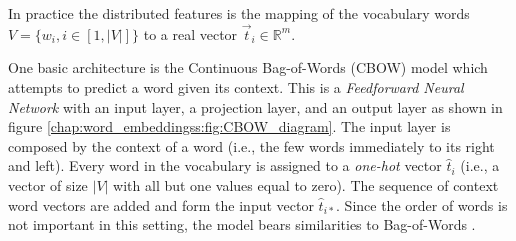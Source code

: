 In practice the distributed features is the mapping of the vocabulary words $V = \{w_{i}, i \in [1, |V|] \}$ to a real vector $\vec{t}_i \in \mathbb{R}^{m}$.



One basic architecture is the Continuous Bag-of-Words (CBOW) model which attempts to predict a word given its context. This is a \textit{Feedforward Neural Network} with an input layer, a projection layer, and an output layer as shown in figure \ref{chap:word_embeddingss:fig:CBOW_diagram}. The input layer is composed by the context of a word (i.e., the few words immediately to its right and left). Every word in the vocabulary is assigned to a \textit{one-hot} vector $\hat{t}_{i}$ (i.e., a vector of size $|V|$ with all but one values equal to zero). The sequence of context word vectors are added and form the input vector $\hat{t}_{i*}$. Since the order of words is not important in this setting, the model bears similarities to Bag-of-Words \parencite{mitra2018introduction}.


